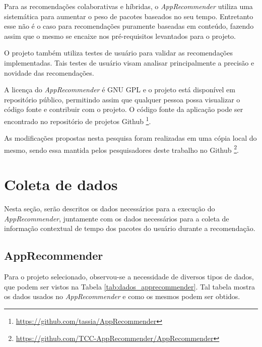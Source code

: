   Para as recomendações colaborativas e híbridas, o \textit{AppRecommender}
  utiliza uma sistemática para aumentar o peso de pacotes baseados no seu tempo.
  Entretanto esse não é o caso para recomendações puramente baseadas em conteúdo,
  fazendo assim que o mesmo se encaixe nos pré-requisitos levantados para o
  projeto.

  O projeto também utiliza testes de usuário para validar as recomendações
  implementadas. Tais testes de usuário visam analisar principalmente a precisão
  e novidade das recomendações.

  A licença do \textit{AppRecommender} é GNU GPL e o projeto está disponível em repositório
  público, permitindo assim que qualquer pessoa possa visualizar o código fonte e
  contribuir com o projeto. O código fonte da aplicação pode ser encontrado no
  repositório de projetos Github \footnote{\url{https://github.com/tassia/AppRecommender}}.

  As modificações propostas nesta pesquisa foram realizadas em uma cópia local do
  mesmo, sendo essa mantida pelos pesquisadores deste trabalho no Github \footnote{\url{https://github.com/TCC-AppRecommender/AppRecommender}}.

  \section{Coleta de dados}

  Nesta seção, serão descritos os dados necessários para a execução do
  \textit{AppRecommender}, juntamente com os dados necessários para a coleta de
  informação contextual de tempo dos pacotes do usuário durante a
  recomendação.

  \subsection{AppRecommender}

  Para o projeto selecionado, observou-se a necessidade de diversos tipos
  de dados, que podem ser vistos na Tabela
  \ref{tab:dados_apprecommender}. Tal tabela mostra os dados usados no
  \textit{AppRecommender} e como os mesmos podem ser obtidos.

